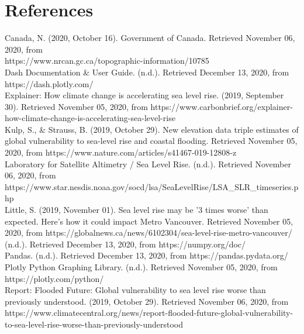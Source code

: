\documentclass[fontsize=11pt]{article}
\begin{document}
\section*{References}
\begin{hangparas}{.25in}{1}
Canada, N. (2020, October 16). Government of Canada. Retrieved November 06, 2020, from \\ https://www.nrcan.gc.ca/topographic-information/10785 \\

Dash Documentation & User Guide. (n.d.). Retrieved December 13, 2020, from https://dash.plotly.com/ \\

Explainer: How climate change is accelerating sea level rise. (2019, September 30). Retrieved November 05, 2020, from https://www.carbonbrief.org/explainer-how-climate-change-is-accelerating-sea-level-rise \\

Kulp, S., & Strauss, B. (2019, October 29). New elevation data triple estimates of global vulnerability to sea-level rise and coastal flooding. Retrieved November 05, 2020, from https://www.nature.com/articles/s41467-019-12808-z \\

Laboratory for Satellite Altimetry / Sea Level Rise. (n.d.).
Retrieved November 06, 2020, from \\ https://www.star.nesdis.noaa.gov/socd/lsa/SeaLevelRise/LSA_SLR_timeseries.php \\

Little, S. (2019, November 01). Sea level rise may be '3 times worse' than expected. Here's how it could impact Metro Vancouver. Retrieved November 05, 2020, from https://globalnews.ca/news/6102304/sea-level-rise-metro-vancouver/\\

(n.d.). Retrieved December 13, 2020, from https://numpy.org/doc/ \\

Pandas. (n.d.). Retrieved December 13, 2020, from https://pandas.pydata.org/ \\

Plotly Python Graphing Library. (n.d.). Retrieved November 05, 2020, from https://plotly.com/python/ \\

Report: Flooded Future: Global vulnerability to sea level rise worse than previously understood. (2019, October 29). Retrieved November 06, 2020, from https://www.climatecentral.org/news/report-flooded-future-global-vulnerability-to-sea-level-rise-worse-than-previously-understood \\


\end{hangparas}
\end{document}
